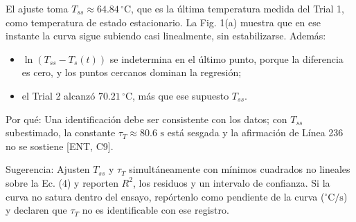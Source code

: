 \documentclass{LabDSTresponse}
\begin{document}
{El ajuste toma $T_{ss} \approx 64.84\,^\circ\text{C}$, que es la última temperatura medida del Trial 1, como temperatura de estado estacionario. La Fig. 1(a) muestra que en ese instante la curva sigue subiendo casi linealmente, sin estabilizarse. Además:
\begin{itemize}
    \item $\ln(T_{ss} - T_s(t))$ se indetermina en el último punto, porque la diferencia es cero, y los puntos cercanos dominan la regresión;
    \item el Trial 2 alcanzó $70.21\,^\circ\text{C}$, más que ese supuesto $T_{ss}$.
\end{itemize}

Por qué: Una identificación debe ser consistente con los datos; con $T_{ss}$ subestimado, la constante $\tau_T \approx 80.6\text{ s}$ está sesgada y la afirmación de Línea 236 no se sostiene [ENT, C9].

Sugerencia: Ajusten $T_{ss}$ y $\tau_T$ simultáneamente con mínimos cuadrados no lineales sobre la Ec. (4) y reporten $R^2$, los residuos y un intervalo de confianza. Si la curva no satura dentro del ensayo, repórtenlo como pendiente de la curva ($^\circ\text{C/s}$) y declaren que $\tau_T$ no es identificable con ese registro.}
\end{document}
